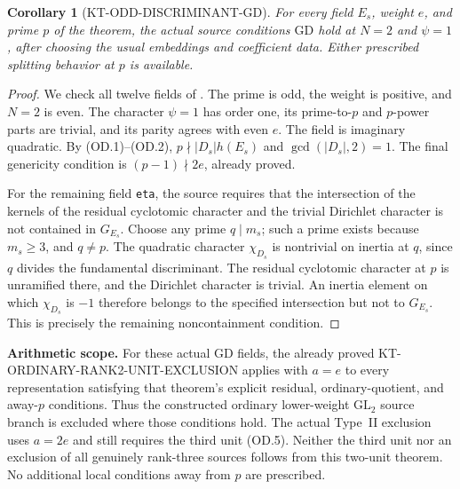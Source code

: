 \documentclass[11pt,a4paper]{article}
\newtheorem{corollary}[theorem]{Corollary}
\theoremstyle{definition}
\renewcommand{\paragraph}[1]{\par\smallskip\noindent\textbf{#1}\quad\ignorespaces}
\begin{document}
\begin{corollary}[KT-ODD-DISCRIMINANT-GD]
For every field $E_s$, weight $e$, and prime $p$ of the theorem,
the actual source conditions $\mathrm{GD}$ hold at $N=2$ and
$\psi=1$, after choosing the usual embeddings and coefficient
data.  Either prescribed splitting behavior at $p$ is available.
\end{corollary}
\begin{proof}
We check all twelve fields of
.
The prime is odd, the weight is positive, and $N=2$ is even.
The character $\psi=1$ has order one, its prime-to-$p$ and
$p$-power parts are trivial, and its parity agrees with even $e$.
The field is imaginary quadratic.  By (OD.1)--(OD.2),
$p\nmid |D_s|h(E_s)$ and $\gcd(|D_s|,2)=1$.
The final genericity condition is $(p-1)\nmid2e$, already proved.

For the remaining field \texttt{eta}, the source requires that
the intersection of the kernels of the residual cyclotomic
character and the trivial Dirichlet character is not contained
in $G_{E_s}$.  Choose any prime $q\mid m_s$; such a prime exists
because $m_s\geq3$, and $q\ne p$.  The quadratic character
$\chi_{D_s}$ is nontrivial on inertia at $q$, since $q$ divides
the fundamental discriminant.  The residual cyclotomic character
at $p$ is unramified there, and the Dirichlet character is trivial.
An inertia element on which $\chi_{D_s}$ is $-1$ therefore
belongs to the specified intersection but not to $G_{E_s}$.
This is precisely the remaining noncontainment condition.
\end{proof}

\paragraph{Arithmetic scope.}
For these actual GD fields, the already proved
KT-ORDINARY-RANK2-UNIT-EXCLUSION applies with $a=e$ to every
representation satisfying that theorem's explicit residual,
ordinary-quotient, and away-$p$ conditions.  Thus the constructed
ordinary lower-weight $\mathrm{GL}_2$ source branch is excluded
where those conditions hold.  The actual Type~II exclusion uses
$a=2e$ and still requires the third unit (OD.5).
Neither the third unit nor an exclusion of all genuinely rank-three
sources follows from this two-unit theorem.  No additional local
conditions away from $p$ are prescribed.
\end{document}
